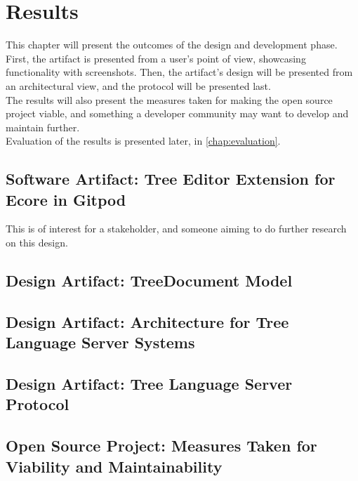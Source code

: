 \chapter{Results}\label{chap:results}

This chapter will present the outcomes of the design and development phase.
First, the artifact is presented from a user's point of view, showcasing functionality with screenshots.
Then, the artifact's design will be presented from an architectural view, and the protocol will be presented last.\\

The results will also present the measures taken for making the \gls{open source} project viable, and something a developer community may want to develop and maintain further.\\

Evaluation of the results is presented later, in \cref{chap:evaluation}.

\section{Software Artifact: Tree Editor Extension for Ecore in Gitpod}

This is of interest for a stakeholder, and someone aiming to do further research on this design.



\section{Design Artifact: TreeDocument Model}




\section{Design Artifact: Architecture for Tree Language Server Systems}




\section{Design Artifact: Tree Language Server Protocol}\label{sec:tlsp}




\section{Open Source Project: Measures Taken for Viability and Maintainability}


